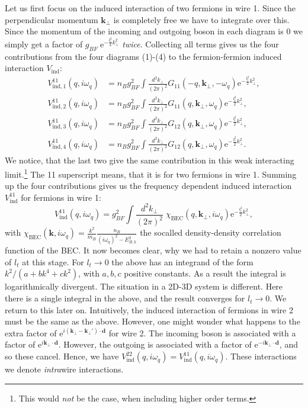 Let us first focus on the induced interaction of two fermions in wire 1. Since the perpendicular momentum $\mathbf{k}_\perp$ is completely free we have to integrate over this. Since the momentum of the incoming and outgoing boson in each diagram is 0 we simply get a factor of $g_{BF}\; \text{e}^{-\frac{l_t^2}{4}k_\perp^2}$ \textit{twice}. Collecting all terms gives us the four contributions from the four diagrams (1)-(4) to the fermion-fermion induced interaction $V_{\text{ind}}$: 
\begin{align}
V^{11}_{\text{ind}, 1}(q,i\omega_q) &= n_Bg_{BF}^2\int\frac{d^2k_\perp}{(2\pi)^2}G_{11}(-q,\mathbf{k}_\perp,-\omega_q)\text{e}^{-\frac{l_t^2}{2}k_\perp^2}, \nonumber \\
V^{11}_{\text{ind}, 2}(q,i\omega_q) &= n_Bg_{BF}^2\int\frac{d^2k_\perp}{(2\pi)^2}G_{11}(q,\mathbf{k}_\perp,\omega_q)\text{e}^{-\frac{l_t^2}{2}k_\perp^2}, \nonumber \\
V^{11}_{\text{ind}, 3}(q,i\omega_q) &= n_Bg_{BF}^2\int\frac{d^2k_\perp}{(2\pi)^2}G_{12}(q,\mathbf{k}_\perp,\omega_q)\text{e}^{-\frac{l_t^2}{2}k_\perp^2}, \nonumber \\
V^{11}_{\text{ind}, 4}(q,i\omega_q) &= n_Bg_{BF}^2\int\frac{d^2k_\perp}{(2\pi)^2}G_{12}(q,\mathbf{k}_\perp,\omega_q)\text{e}^{-\frac{l_t^2}{2}k_\perp^2}. 
\end{align}
We notice, that the last two give the same contribution in this weak interacting limit.\footnote{This would \textit{not} be the case, when including higher order terms.} The 11 superscript means, that it is for two fermions in wire 1. Summing up the four contributions gives us the frequency dependent induced interaction $V^{11}_{\text{ind}}$ for fermions in wire 1:
\begin{equation}
V^{11}_{\text{ind}}(q,i\omega_q) = g_{BF}^2\int\frac{d^2k_\perp}{(2\pi)^2}\; \chi_\text{BEC}(q,\mathbf{k}_\perp,i\omega_q)\text{e}^{-\frac{l_t^2}{2}k_\perp^2}, 
\label{eq.V11indXBEC}
\end{equation}
with $\chi_\text{BEC}(\mathbf{k},i\omega_q) = \frac{k^2}{m_B}\frac{n_B}{(i\omega_q)^2 - E_{B,k}^2}$ the socalled density-density correlation function of the BEC. It now becomes clear, why we had to retain a nonzero value of $l_t$ at this stage. For $l_t\to 0$ the above has an integrand of the form $k^2/(a + bk^4 + ck^2)$, with $a,b,c$ positive constants. As a result the integral is logarithmically divergent. The situation in a 2D-3D system is different. Here there is a single integral in the above, and the result converges for $l_t\to 0$. We return to this later on. Intuitively, the induced interaction of fermions in wire 2 must be the same as the above. However, one might wonder what happens to the extra factor of $\text{e}^{i(\mathbf{k}_\perp - \mathbf{k}_\perp')\cdot \mathbf{d}}$ for wire 2. The incoming boson is associated with a factor of $\text{e}^{i\mathbf{k}_\perp\cdot \mathbf{d}}$. However, the outgoing is associated with a factor of $\text{e}^{-i\mathbf{k}_\perp\cdot \mathbf{d}}$, and so these cancel. Hence, we have $V^{22}_{\text{ind}}(q,i\omega_q) = V^{11}_{\text{ind}}(q,i\omega_q)$. These interactions we denote \textit{intra}wire interactions. 

